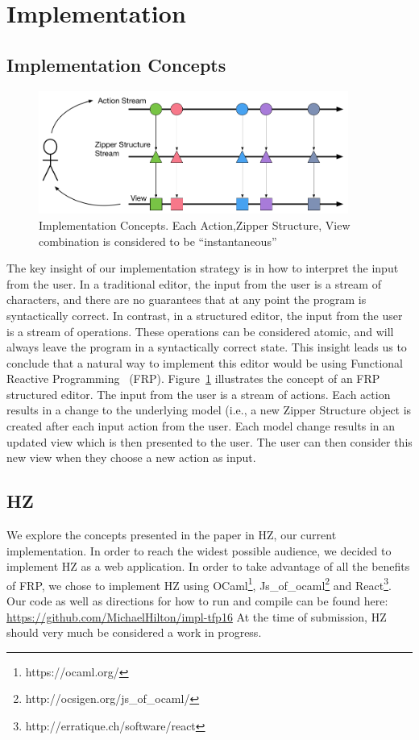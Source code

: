 \documentclass{llncs}
\begin{document}
\section{Implementation}
\label{sec:impl}

\subsection{Implementation Concepts}

\begin{figure}
\centering
\includegraphics[width=4in]{Implementation_Diagram}
\caption{Implementation Concepts. Each Action,Zipper Structure, View combination is considered to be ``instantaneous''}
\label{fig:FRP}
\end{figure}

The key insight of our implementation strategy is in how to interpret the input from the user.
In a traditional editor, the input from the user is a stream of characters, and there are no guarantees that at any point the program is syntactically correct.
In contrast, in a structured editor, the input from the user is a stream of operations.  These operations can be considered atomic, and will always leave the program in a syntactically correct state.
This insight leads us to conclude that a natural way to implement this editor would be using Functional Reactive Programming~\cite{Wan:2000:FRP:349299.349331} (FRP).
Figure~\ref{fig:FRP} illustrates the concept of an FRP structured editor.
The input from the user is a stream of actions.  Each action results in a change to the underlying model (i.e., a new Zipper Structure object is created after each input action from the user.
Each model change results in an updated view which is then presented to the user.  The user can then consider this new view when they choose a new action as input.

\subsection{HZ}
We explore the concepts presented in the paper in HZ, our current implementation.
In order to reach the widest possible audience, we decided to implement HZ as a web application.
In order to take advantage of all the benefits of FRP, we chose to implement HZ using OCaml\footnote{https://ocaml.org/}, Js\_of\_ocaml\footnote{http://ocsigen.org/js\_of\_ocaml/} and React\footnote{http://erratique.ch/software/react}.
Our code as well as directions for how to run and compile can be found here: \url{https://github.com/MichaelHilton/impl-tfp16}
At the time of submission, HZ should very much be considered a work in progress.
\end{document}
